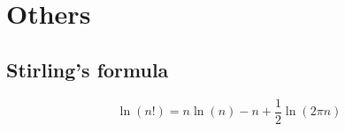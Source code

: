 \section{Others}

\subsection*{Stirling's formula}

\begin{equation*}
    \ln (n!) = n  \ln (n) - n + \frac{1}{2} \ln (2 \pi n)
\end{equation*}